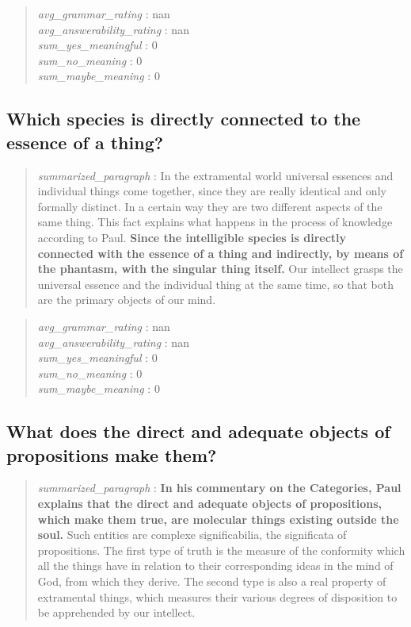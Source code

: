 \begin{quote}
\emph{avg\_grammar\_rating} : nan\\
\emph{avg\_answerability\_rating} : nan\\
\emph{sum\_yes\_meaningful} : 0\\
\emph{sum\_no\_meaning} : 0\\
\emph{sum\_maybe\_meaning} : 0
\end{quote}

\hypertarget{which-species-is-directly-connected-to-the-essence-of-a-thing}{%
\subsection{Which species is directly connected to the essence of a
thing?}\label{which-species-is-directly-connected-to-the-essence-of-a-thing}}

\begin{quote}
\emph{summarized\_paragraph} : In the extramental world universal
essences and individual things come together, since they are really
identical and only formally distinct. In a certain way they are two
different aspects of the same thing. This fact explains what happens in
the process of knowledge according to Paul. \textbf{Since the
intelligible species is directly connected with the essence of a thing
and indirectly, by means of the phantasm, with the singular thing
itself.} Our intellect grasps the universal essence and the individual
thing at the same time, so that both are the primary objects of our
mind.
\end{quote}

\begin{quote}
\emph{avg\_grammar\_rating} : nan\\
\emph{avg\_answerability\_rating} : nan\\
\emph{sum\_yes\_meaningful} : 0\\
\emph{sum\_no\_meaning} : 0\\
\emph{sum\_maybe\_meaning} : 0
\end{quote}

\hypertarget{what-does-the-direct-and-adequate-objects-of-propositions-make-them}{%
\subsection{What does the direct and adequate objects of propositions
make
them?}\label{what-does-the-direct-and-adequate-objects-of-propositions-make-them}}

\begin{quote}
\emph{summarized\_paragraph} : \textbf{In his commentary on the
Categories, Paul explains that the direct and adequate objects of
propositions, which make them true, are molecular things existing
outside the soul.} Such entities are complexe significabilia, the
significata of propositions. The first type of truth is the measure of
the conformity which all the things have in relation to their
corresponding ideas in the mind of God, from which they derive. The
second type is also a real property of extramental things, which
measures their various degrees of disposition to be apprehended by our
intellect.
\end{quote}

